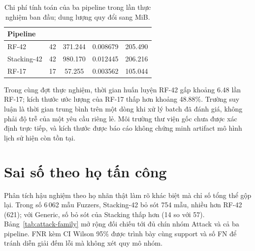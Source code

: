 \begin{table}[htbp]
\centering
\small
\renewcommand{\arraystretch}{1.3}
\setlength{\tabcolsep}{6pt}
\caption{Chi phí tính toán của ba pipeline trong lần thực nghiệm ban đầu; dung lượng quy đổi sang MiB.}
\label{tab:chi-phi}
\begin{tabularx}{\linewidth}{>{\raggedright\arraybackslash}X S[table-format=2.0] S[table-format=4.3] S[table-format=1.6] S[table-format=3.3]}
\toprule
Pipeline & {} & {} & {} & {}\\
\midrule
RF-42 & 42 & 371.244 & 0.008679 & 205.490\\
Stacking-42 & 42 & 980.170 & 0.012445 & 206.216\\
RF-17 & 17 & 57.255 & 0.003562 & 105.044\\
\bottomrule
\end{tabularx}
\end{table}

Trong cùng đợt thực nghiệm, thời gian huấn luyện RF-42 gấp khoảng 6.48 lần RF-17; kích thước ước lượng của RF-17 thấp hơn khoảng 48.88\%. Trường suy luận là thời gian trung bình trên một dòng khi xử lý batch đã đánh giá, không phải độ trễ của một yêu cầu riêng lẻ. Môi trường thư viện gốc chưa được xác định trực tiếp, và kích thước được báo cáo không chứng minh artifact mô hình lịch sử hiện còn tồn tại.

\section{Sai số theo họ tấn công}
\label{sec:attack-family-error}

Phân tích hậu nghiệm theo họ nhãn thật làm rõ khác biệt mà chỉ số tổng thể gộp lại. Trong số 6\,062 mẫu Fuzzers, Stacking-42 bỏ sót 754 mẫu, nhiều hơn RF-42 (621); với Generic, số bỏ sót của Stacking thấp hơn (14 so với 57). Bảng~\ref{tab:attack-family} mở rộng đối chiếu tới đủ chín nhóm Attack và cả ba pipeline. FNR kèm CI Wilson 95\% được trình bày cùng support và số FN để tránh diễn giải đếm lỗi mà không xét quy mô nhóm.

